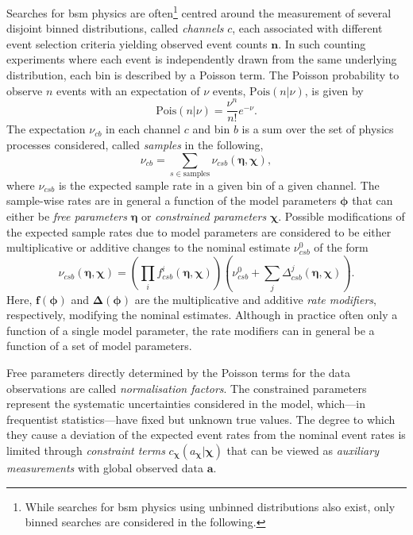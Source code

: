 Searches for \gls{bsm} physics are often\footnote{While searches for \gls{bsm} physics using unbinned distributions also exist, only binned searches are considered in the following.} centred around the measurement of several disjoint binned distributions, called \textit{channels} $c$, each associated with different event selection criteria yielding observed event counts $\boldsymbol{n}$.
In such counting experiments where each event is independently drawn from the same underlying distribution, each bin is described by a Poisson term.
The Poisson probability to observe $n$ events with an expectation of $\nu$ events, $\mathrm{Pois}(n\vert\nu)$, is given by
\begin{equation}
	\mathrm{Pois}(n\vert\nu) = \frac{\nu^n}{n!}e^{-\nu}.
\end{equation}
The expectation $\nu_{cb}$ in each channel $c$ and bin $b$ is a sum over the set of physics processes considered, called \textit{samples} in the following, 
\begin{equation}
	\nu_{cb} = \sum_{s\in\mathrm{samples}}\nu_{csb}(\boldsymbol{\eta},\boldsymbol{\chi}),
\end{equation}
where $\nu_{csb}$ is the expected sample rate in a given bin of a given channel. The sample-wise rates are in general a function of the model parameters $\boldsymbol{\phi}$ that can either be \textit{free parameters} $\boldsymbol{\eta}$ or \textit{constrained parameters} $\boldsymbol{\chi}$. Possible modifications of the expected sample rates due to model parameters are considered to be either multiplicative or additive changes to the nominal estimate $\nu_{csb}^0$ of the form
\begin{equation}
	\nu_{csb}(\boldsymbol{\eta},\boldsymbol{\chi}) = \left(\prod_i f^i_{csb}(\boldsymbol{\eta},\boldsymbol{\chi}) \right)\left(\nu^0_{csb} + \sum_j {\Delta^j_{csb}(\boldsymbol{\eta},\boldsymbol{\chi})} \right).
\end{equation}
Here, $\boldsymbol{f}(\boldsymbol{\phi})$ and $\boldsymbol{\Delta}(\boldsymbol{\phi})$ are the multiplicative and additive \textit{rate modifiers}, respectively, modifying the nominal estimates. Although in practice often only a function of a single model parameter, the rate modifiers can in general be a function of a set of model parameters.

Free parameters directly determined by the Poisson terms for the data observations are called \textit{normalisation factors}.
The constrained parameters represent the systematic uncertainties considered in the model, which---in frequentist statistics---have fixed but unknown true values.
The degree to which they cause a deviation of the expected event rates from the nominal event rates is limited through \textit{constraint terms} $c_{\boldsymbol{\chi}}(a_{\boldsymbol{\chi}}\vert\boldsymbol{\chi})$ that can be viewed as \textit{auxiliary measurements} with global observed data $\boldsymbol{a}$. 

